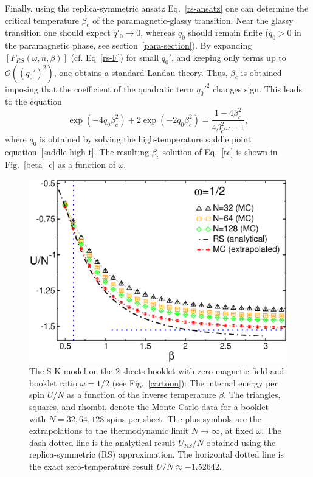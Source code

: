 \documentclass[twocolumn,superscriptaddress,prb,10pt]{revtex4-1}
\begin{document}
Finally, using the replica-symmetric ansatz Eq.~\eqref{rs-ansatz} one can determine 
the critical temperature $\beta_c$ of the paramagnetic-glassy transition. 
Near the glassy transition one should expect $q'_0\to0$, whereas $q_0$ 
should remain finite ($q_0>0$ in the paramagnetic phase, see section~\ref{para-section}). 
By expanding $[F_{RS}(\omega,n,\beta)]$ (cf. Eq~\eqref{rs-F}) for small $q_0'$, and 
keeping only terms up to ${\mathcal O}((q_0')^2)$, one obtains a standard Landau theory. 
Thus, $\beta_c$ is obtained imposing that the coefficient of the quadratic term $q_0'^2$ 
changes sign. This leads to the equation 
%
\begin{equation}
\exp(-4q_0\beta^2_c)+2\exp(-2q_0\beta^2_c)=\frac{1-4\beta^2_c}
{4\beta^2_c\omega-1},
\label{tc}
\end{equation}
%
where $q_0$ is obtained by solving the high-temperature saddle point 
equation~\eqref{saddle-high-t}. The resulting $\beta_c$ solution of Eq.~\eqref{tc} 
is shown in Fig.~\ref{beta_c} as a function of $\omega$. 

\begin{figure}[t]
\includegraphics*[width=0.93\linewidth]{./draft_figs/U_w05}
\caption{
 The S-K model on the $2$-sheets booklet with zero magnetic field and 
 booklet ratio $\omega=1/2$ (see Fig.~\ref{cartoon}): The internal energy 
 per spin $U/N$ as a function of the inverse temperature $\beta$. The triangles, 
 squares, and rhombi, denote the Monte Carlo data for a booklet with 
 $N=32,64,128$ spins per sheet. The plus symbols are the extrapolations to the 
 thermodynamic limit $N\to\infty$, at fixed $\omega$. The dash-dotted line is the 
 analytical result $U_{RS}/N$ obtained using the replica-symmetric (RS) approximation. 
 The horizontal dotted line is the exact zero-temperature result $U/N\approx-1.52642$.
}
\label{U-MC}
\end{figure}
\end{document}
